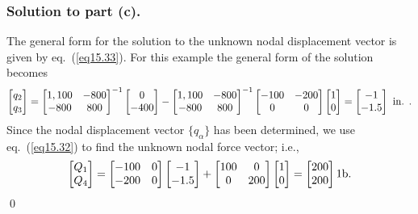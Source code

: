 \documentclass{AeroStructure-ERJohnson}
\begin{document}
\begin{example*}
\enlargethispage{-2\baselineskip}

\subsubsection{Solution to part (c).} The general form for the solution to the unknown nodal displacement vector is given by eq.~(\ref{eq15.33}). For this example the general form of the solution becomes
\begin{align}\label{ex15.2h}
\left[\begin{array}{@{}l@{}}q_{2} \\q_{3}\end{array}\right]=\left[\begin{array}{@{}cc@{}}1,100 & -800 \\-800 & 800\end{array}\right]^{-1}\left[\begin{array}{@{}c@{}}0 \\-400\end{array}\right]-\left[\begin{array}{@{}cc@{}}1,100 & -800 \\-800 & 800\end{array}\right]^{-1}\left[\begin{array}{@{}cc@{}}-100 & -200 \\0 & 0\end{array}\right]\left[\begin{array}{@{}l@{}}1 \\0\end{array}\right]=\left[\begin{array}{@{}c@{}}-1 \\-1.5\end{array}\right] \text{ in. }.
\end{align}
Since the nodal displacement vector $\{q_{\alpha}\}$ has been determined, we use eq.~(\ref{eq15.32}) to find the unknown nodal force vector; i.e.,
\begin{align}\label{ex15.2i}
\left[\begin{array}{@{}l@{}}Q_{1} \\Q_{4}\end{array}\right]=\left[\begin{array}{@{}ll@{}}-100 & 0 \\-200 & 0\end{array}\right]\left[\begin{array}{@{}c@{}}-1 \\-1.5\end{array}\right]+\left[\begin{array}{@{}cc@{}}100 & 0 \\0 & 200 \end{array}\right]\left[\begin{array}{@{}l@{}}1 \\0\end{array}\right]=\left[\begin{array}{@{}l@{}}200 \\200\end{array}\right]1\textrm{b}.
\end{align}
\hfill\qed
\end{example*}
\end{document}

